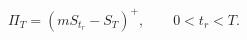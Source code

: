 \documentclass{equation-sheet}
\begin{document}
\begin{equation*}
\Pi_T = \left(mS_{t_r}-S_T\right)^{+},
\qquad 0<t_r<T.
\end{equation*}
\end{document}
